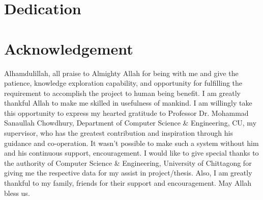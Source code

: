 \documentclass[12pt, top = 1 inch, bottom = 1 inch, left = 1.2 inch, top = .8 inch]{book}
\begin{document}
	\section*{Dedication}

	{
		}
	\newpage
	\section*{Acknowledgement}
	Alhamdulillah, all praise to Almighty Allah for being with me and give the patience, knowledge exploration capability, and opportunity for fulfilling the requirement to accomplish the project to human being benefit. I am greatly thankful Allah to make me skilled in usefulness of mankind.
	I am willingly take this opportunity to express my hearted gratitude to Professor Dr. Mohammad Sanaullah Chowdhury, Department of Computer Science \& Engineering, CU, my supervisor, who has the greatest contribution and inspiration through his guidance and co-operation. It wasn’t possible to make such a system without him and his continuous support, encouragement.
	I would like to give special thanks to the authority of Computer Science \& Engineering, University of Chittagong for giving me the respective data for my assist in project/thesis. Also, I am greatly thankful to my family, friends for their support and encouragement. May Allah bless us.
	\newpage
	\tableofcontents
	\listoffigures
	\newpage
\end{document}
